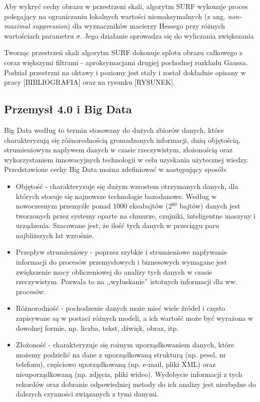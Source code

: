 Aby wykryć cechy obrazu w przestrzeni skali, algorytm SURF wykonuje proces polegający na ograniczaniu lokalnych wartości niemaksymalnych (z ang. \textit{non-maximal suppression}) dla wyznaczników macierzy Hessego przy różnych wartościach parametru $\sigma$. Jego działanie sprowadza się do wyliczania zwiększania  

Tworząc przestrzeń skali algorytm SURF dokonuje splotu obrazu całkowego z coraz większymi filtrami - aproksymacjami drugiej pochodnej rozkładu Gaussa. Podział przestrzni na oktawy i poziomy jest stały i został dokładnie opisany w pracy [BIBLIOGRAFIA] oraz na rysunku [RYSUNEK].

\subsection{Przemysł 4.0 i Big Data}

Big Data według \cite{BigDataTabakow} to termin stosowany do dużych zbiorów danych, które charakteryzują się różnorodnością gromadzonych informacji, dużą objętością, strumieniowym napływem danych w czasie rzeczywistym, złożonością oraz wykorzystaniem innowacyjnych technologii w celu uzyskania użytecznej wiedzy. Przedstawione cechy Big Data można zdefiniować w następujący sposób: 

\begin{itemize}
	\item Objętość - charakteryzuje się dużym wzrostem otrzymanych danych, dla których stosuje się najnowsze technologie bazodanowe. Według \cite{Industry40} w nowoczesnym przemyśle ponad 1000 eksabajtów (2$^{60}$ bajtów) danych jest tworzonych przez systemy oparte na chmurze, czujniki, inteligentne maszyny i urządzenia. Szacowane jest, że ilość tych danych w przeciągu paru najbliższych lat wzrośnie.
	
	\item Przepływ strumieniowy - poprzez szybkie i strumieniowe napływanie informacji do procesów przemysłowych i biznesowych wymagane jest zwiększenie mocy obliczeniowej do analizy tych danych w czasie rzeczywistym. Pozwala to na ,,wyłuskanie'' istotnych informacji dla ww. procesów.
	
	\item Różnorodność - pochodzenie danych może mieć wiele źródeł i często zapisywane są w postaci różnych modeli, a ich wartość może być wyrażona w dowolnej formie, np. liczba, tekst, dźwięk, obraz, itp.
	
	\item Złożoność - charakteryzuje się rożnym uporządkowaniem danych, które możemy podzielić na dane z uporządkowaną strukturą (np. pesel, nr telefonu), częściowo uporządkowaną (np. e-mail, pliki XML) oraz nieuporządkowaną (np. zdjęcia, pliki wideo). Wydobycie informacji z tych rekordów oraz dobranie odpowiedniej metody do ich analizy jest niezbędne do dalszych czynności związanych z tymi danymi. 
	
\end{itemize} 


